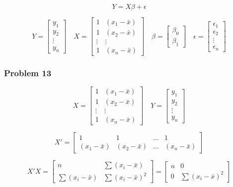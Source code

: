 \documentclass[
]{article}
\begin{document}
\[
Y = X \beta + \epsilon
\]

\[
Y = \begin{bmatrix}
    y_1 \\
    y_2 \\
    \vdots \\
    y_n
\end{bmatrix} \quad
X = \begin{bmatrix}
    1 & (x_1 - \bar{x}) \\
    1 & (x_2 - \bar{x}) \\
    \vdots & \vdots \\
    1 & (x_n - \bar{x})
\end{bmatrix} \quad
\beta = \begin{bmatrix}
    \beta_0 \\
    \beta_1
\end{bmatrix} \quad
\epsilon = \begin{bmatrix}
    \epsilon_1 \\
    \epsilon_2 \\
    \vdots \\
    \epsilon_n
\end{bmatrix}
\]

\hfill\break

\hypertarget{problem-13}{%
\subsubsection{Problem 13}\label{problem-13}}

\[
X = \begin{bmatrix}
1 & (x_1 - \bar{x}) \\
1 & (x_2 - \bar{x}) \\
\vdots & \vdots \\
1 & (x_n - \bar{x})
\end{bmatrix} \quad
Y = \begin{bmatrix}
y_1 \\
y_2 \\
\vdots \\
y_n
\end{bmatrix}
\]

\[
X' = \begin{bmatrix}
1 & 1 & \dots & 1 \\
(x_1 - \bar{x}) & (x_2 - \bar{x}) & \dots & (x_n - \bar{x})
\end{bmatrix}
\]

\[
X'X = \begin{bmatrix}
n & \sum (x_i - \bar{x}) \\
\sum (x_i - \bar{x}) & \sum (x_i - \bar{x})^2
\end{bmatrix} = \begin{bmatrix}
n & 0 \\
0 & \sum (x_i - \bar{x})^2
\end{bmatrix}
\]
\end{document}
